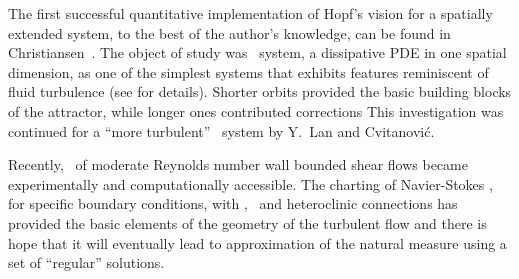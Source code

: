 The first successful quantitative implementation of Hopf's
vision for a spatially extended system, to the best of the
author's knowledge, can be found in
Christiansen~\etal{}. The object of study
was \KS\ system, a dissipative PDE in one spatial dimension,
as one of the simplest systems that exhibits features
reminiscent of fluid turbulence (see  for
details).  Shorter orbits provided
the basic building blocks of the attractor, while longer ones
contributed corrections 
This investigation was continued
for a ``more turbulent'' \KS\ system by Y.~Lan and
Cvitanovi\'c. 

Recently, \statesp\ of moderate Reynolds number wall bounded
shear flows became experimentally and
computationally
accessible. The charting of Navier-Stokes \statesp, for
specific boundary conditions, with \eqva, \reqva\
and heteroclinic connections has provided the basic elements of
the geometry of the turbulent flow and there is hope that it
will eventually lead to approximation of the natural measure
using a set of ``regular'' solutions.
